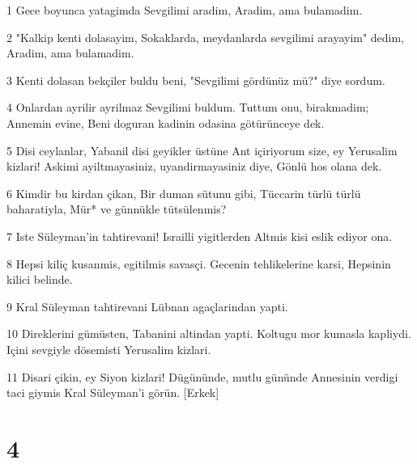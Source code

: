 \par 1 Gece boyunca yatagimda Sevgilimi aradim, Aradim, ama bulamadim.
\par 2 "Kalkip kenti dolasayim, Sokaklarda, meydanlarda sevgilimi arayayim" dedim, Aradim, ama bulamadim.
\par 3 Kenti dolasan bekçiler buldu beni, "Sevgilimi gördünüz mü?" diye sordum.
\par 4 Onlardan ayrilir ayrilmaz Sevgilimi buldum. Tuttum onu, birakmadim; Annemin evine, Beni doguran kadinin odasina götürünceye dek.
\par 5 Disi ceylanlar, Yabanil disi geyikler üstüne Ant içiriyorum size, ey Yerusalim kizlari! Askimi ayiltmayasiniz, uyandirmayasiniz diye, Gönlü hos olana dek.
\par 6 Kimdir bu kirdan çikan, Bir duman sütunu gibi, Tüccarin türlü türlü baharatiyla, Mür* ve günnükle tütsülenmis?
\par 7 Iste Süleyman'in tahtirevani! Israilli yigitlerden Altmis kisi eslik ediyor ona.
\par 8 Hepsi kiliç kusanmis, egitilmis savasçi. Gecenin tehlikelerine karsi, Hepsinin kilici belinde.
\par 9 Kral Süleyman tahtirevani Lübnan agaçlarindan yapti.
\par 10 Direklerini gümüsten, Tabanini altindan yapti. Koltugu mor kumasla kapliydi. Içini sevgiyle dösemisti Yerusalim kizlari.
\par 11 Disari çikin, ey Siyon kizlari! Dügününde, mutlu gününde Annesinin verdigi taci giymis Kral Süleyman'i görün. [Erkek]

\chapter{4}

